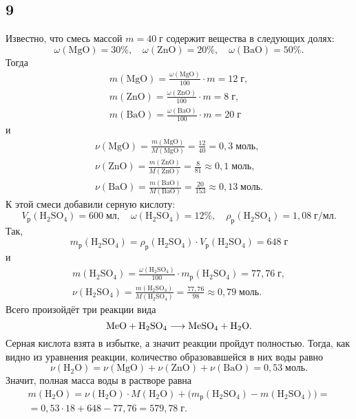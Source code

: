 \subsection{9}

Известно, что смесь массой $m=40\;\text{г}$ содержит вещества в следующих долях:
\[
\omega(\mathrm{MgO})=30\%,\quad\omega(\mathrm{ZnO})=20\%,\quad\omega(\mathrm{BaO})=50\%.
\]
Тогда
\begin{gather*}
m(\mathrm{MgO})=\frac{\omega(\mathrm{MgO})}{100}\cdot m=12\;\text{г}, \\
m(\mathrm{ZnO})=\frac{\omega(\mathrm{ZnO})}{100}\cdot m=8\;\text{г}, \\
m(\mathrm{BaO})=\frac{\omega(\mathrm{BaO})}{100}\cdot m=20\;\text{г}
\end{gather*}
и
\begin{gather*}
\nu(\mathrm{MgO})=\frac{m(\mathrm{MgO})}{M(\mathrm{MgO})}=\frac{12}{40}=0{,}3\;\text{моль}, \\
\nu(\mathrm{ZnO})=\frac{m(\mathrm{ZnO})}{M(\mathrm{ZnO})}=\frac{8}{81}\approx0{,}1\;\text{моль}, \\
\nu(\mathrm{BaO})=\frac{m(\mathrm{BaO})}{M(\mathrm{BaO})}=\frac{20}{153}\approx0{,}13\;\text{моль}.
\end{gather*}
К этой смеси добавили серную кислоту:
\[
V_\text{р}(\mathrm{H_2SO_4})=600\;\text{мл},\quad\omega(\mathrm{H_2SO_4})=12\%,\quad\rho_\text{р}(\mathrm{H_2SO_4})=1{,}08\;\text{г/мл}.
\]
Так,
\[
m_\text{р}(\mathrm{H_2SO_4})=\rho_\text{р}(\mathrm{H_2SO_4})\cdot V_\text{р}(\mathrm{H_2SO_4})=648\;\text{г}
\]
и
\begin{gather*}
m(\mathrm{H_2SO_4})=\frac{\omega(\mathrm{H_2SO_4})}{100}\cdot m_\text{р}(\mathrm{H_2SO_4})=77{,}76\;\text{г}, \\
\nu(\mathrm{H_2SO_4})=\frac{m(\mathrm{H_2SO_4})}{M(\mathrm{H_2SO_4})}=\frac{77{,}76}{98}\approx0{,}79\;\text{моль}.
\end{gather*}
Всего произойдёт три реакции вида
\[
\rm MeO+H_2SO_4\longrightarrow MeSO_4+H_2O.
\]
Серная кислота взята в избытке, а значит реакции пройдут полностью. Тогда, как видно из уравнения реакции, количество образовавшейся в них воды равно
\[
\nu(\mathrm{H_2O})=\nu(\mathrm{MgO})+\nu(\mathrm{ZnO})+\nu(\mathrm{BaO})=0{,}53\;\text{моль}.
\]
Значит, полная масса воды в растворе равна
\begin{multline*}
m(\mathrm{H_2O})=\nu(\mathrm{H_2O})\cdot M(\mathrm{H_2O})+\bigl(m_\text{р}(\mathrm{H_2SO_4})-m(\mathrm{H_2SO_4})\bigr)= \\
=0{,}53\cdot18+648-77{,}76=579{,}78\;\text{г}.
\end{multline*}